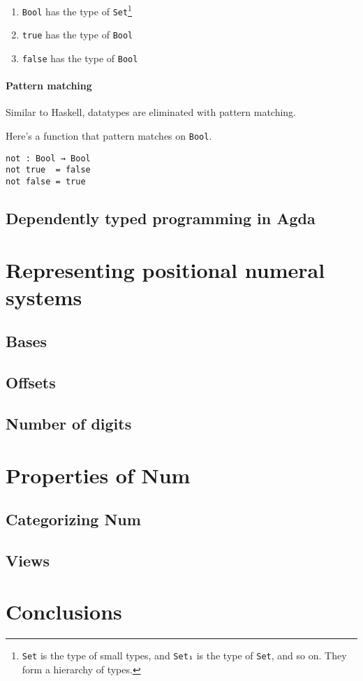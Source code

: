 \documentclass[12pt, a4paper]{article}
\begin{document}
\begin{enumerate}
    \item {\lstinline|Bool|} has the type of {\lstinline|Set|}\footnote{{\lstinline|Set|} is the type of small types, and {\lstinline|Set₁|} is the type
of {\lstinline|Set|}, and so on. They form a hierarchy of types.}
    \item {\lstinline|true|} has the type of {\lstinline|Bool|}
    \item {\lstinline|false|} has the type of {\lstinline|Bool|}
\end{enumerate}

\paragraph{Pattern matching}

Similar to Haskell, datatypes are eliminated with pattern matching.

Here's a function that pattern matches on {\lstinline|Bool|}.

\begin{lstlisting}
not : Bool → Bool
not true  = false
not false = true
\end{lstlisting}





\subsection{Dependently typed programming in Agda}


\section{Representing positional numeral systems}\label{representation}

\subsection{Bases}
\subsection{Offsets}
\subsection{Number of digits}

\section{Properties of Num}
\subsection{Categorizing Num}
\subsection{Views}

\section{Conclusions}\label{conclusions}



\end{document}
